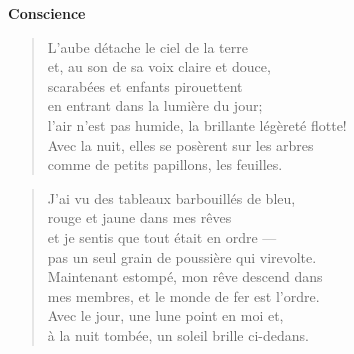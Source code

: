 \vspace*{-15mm}
\centeredornament
\vspace*{2mm}


\begin{center}
  \textbf{\large Conscience}
\end{center}




\begin{verse}
  L'aube détache le ciel de la terre \\
  et, au son de sa voix claire et douce, \\
  scarabées et enfants pirouettent \\
  en entrant dans la lumière du jour; \\
  l'air n'est pas humide, la brillante légèreté flotte!\hspace*{-4mm} \\
  Avec la nuit, elles se posèrent sur les arbres \\
  comme de petits papillons, les feuilles.
\end{verse}

\bigskip




\begin{verse}
  J'ai vu des tableaux barbouillés de bleu, \\
  rouge et jaune dans mes rêves \\
  et je sentis que tout était en ordre --- \\
  pas un seul grain de poussière qui virevolte. \\
  Maintenant estompé, mon rêve descend dans \\
  mes membres, et le monde de fer est l'ordre. \\
  Avec le jour, une lune point en moi et, \\
  à la nuit tombée, un soleil brille ci-dedans.
\end{verse}

\newpage

\vspace*{-15mm}
\centeredornament
\vspace*{2mm}


